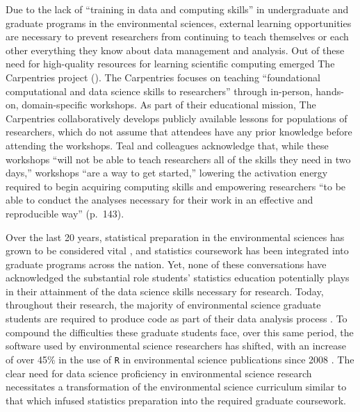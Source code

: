 \documentclass[12pt]{article}
\begin{document}
\quad Due to the lack of ``training in data and computing skills'' 
\citep[p.\ 136]{datacarpentry} in undergraduate and graduate programs in the 
environmental sciences, external learning opportunities are necessary to prevent
researchers from continuing to teach themselves or each other everything they
know about data management and analysis. Out of these need for high-quality
resources for learning scientific computing emerged The Carpentries project
(\citeyear{carpentries}). The Carpentries focuses on teaching ``foundational
computational and data science skills to researchers'' through in-person,
hands-on, domain-specific workshops. As part of their educational mission,
The Carpentries collaboratively develops publicly available lessons for
populations of researchers, which do not assume that attendees have any prior
knowledge before attending the workshops. Teal and colleagues acknowledge that,
while these workshops ``will not be able to teach researchers all of the skills
they need in two days,'' workshops ``are a way to get started,'' lowering the
activation energy required to begin acquiring computing skills and empowering
researchers ``to be able to conduct the analyses necessary for their work in an
effective and reproducible way'' (p.\ 143). 


\quad Over the last 20 years, statistical preparation in the environmental 
sciences has grown to be considered vital \citep{hampton}, and statistics
coursework has been integrated into graduate programs across the nation. Yet,
none of these conversations have acknowledged the substantial role students'
statistics education potentially plays in their attainment of the data science
skills necessary for research. Today, throughout their research, the majority of 
environmental science graduate students are required to produce code as part of
their data analysis process \citep{mislan}. To compound the difficulties these 
graduate students face, over this same period, the software used by
environmental science researchers has shifted, with an increase of over 45\%
in the use of \texttt{R} in environmental science publications since 2008
\citep{Rpopular}. The clear need for data science proficiency in environmental
science research necessitates a transformation of the environmental science
curriculum similar to that which infused statistics preparation into the
required graduate coursework. 
\end{document}
